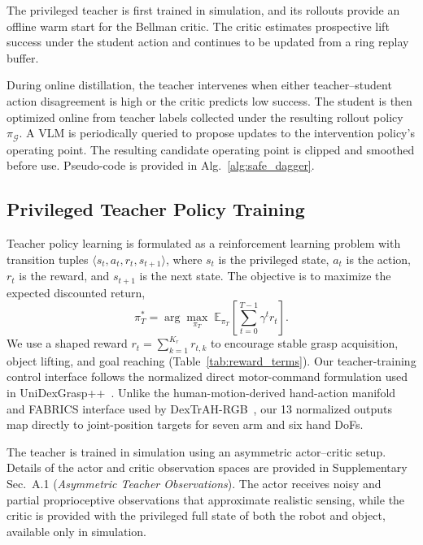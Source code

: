 The privileged teacher is first trained in simulation, and its rollouts provide
an offline warm start for the Bellman critic. The critic estimates
prospective lift success under the student action and continues to be updated
from a ring replay buffer.

During online distillation, the teacher intervenes when either teacher--student
action disagreement is high or the critic predicts low success. The student is
then optimized online from teacher labels collected under the resulting rollout
policy $\pi_{\mathcal{G}}$. A VLM is periodically queried to propose updates to
the intervention policy's operating point. The resulting candidate operating point
is clipped and smoothed before use. Pseudo-code is
provided in Alg.~\ref{alg:safe_dagger}.



\subsection{Privileged Teacher Policy Training}
Teacher policy learning is formulated as a reinforcement learning problem with
transition tuples $\langle s_t,a_t,r_t,s_{t+1}\rangle$, where $s_t$ is the
privileged state, $a_t$ is the action, $r_t$ is the reward, and $s_{t+1}$ is the
next state. The objective is to maximize the expected discounted return,
\begingroup
\small
\begin{equation}
\pi_T^*
=
\arg\max_{\pi_T}\;
\mathbb{E}_{\pi_T}
\left[
\sum_{t=0}^{T-1}\gamma^t r_t
\right].
\label{eq:teacher_rl_objective}
\end{equation}
\endgroup
We use a shaped reward $r_t=\sum_{k=1}^{K_r} r_{t,k}$ to encourage stable grasp
acquisition, object lifting, and goal reaching (Table~\ref{tab:reward_terms}).
Our teacher-training control interface follows the normalized direct motor-command
formulation used in UniDexGrasp++~\cite{wan2023unidexgraspplusplus}. Unlike the
human-motion-derived hand-action manifold and FABRICS interface used by
DexTrAH-RGB~\cite{singh2024dextrah}, our 13 normalized outputs map directly to
joint-position targets for seven arm and six hand DoFs.

The teacher is trained in simulation using an asymmetric actor--critic setup.
Details of the actor and critic observation spaces are provided in
Supplementary Sec.~A.1 (\emph{Asymmetric Teacher Observations}).
The actor receives noisy and partial proprioceptive observations that approximate
realistic sensing, while the critic is provided with the privileged full state
of both the robot and object, available only in simulation.

